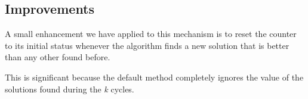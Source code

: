 \subsection{Improvements}
A small enhancement we have applied to this mechanism
is to reset the counter to its initial status
whenever the algorithm finds a new solution
that is better than any other found before.

This is significant because the default method
completely ignores the value of the solutions found
during the \textit{k} cycles.

